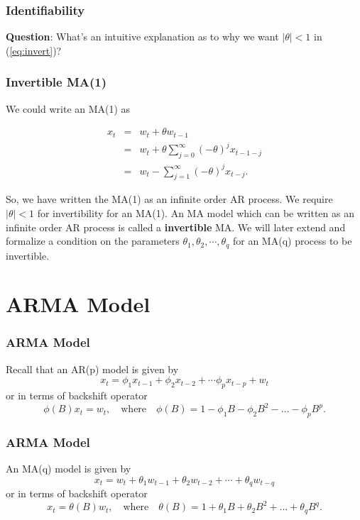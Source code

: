 \documentclass[%
xcolor=pdftex]{beamer}
\begin{document}
\begin{frame}
\frametitle{Identifiability}

\textbf{Question}: What's an intuitive explanation as to why we want $|\theta|<1$ in (\ref{eq:invert})?

\vspace{60mm}

\end{frame}


\begin{frame}
\frametitle{Invertible MA(1)}

We could write an MA(1) as

\begin{eqnarray*}
 x_t &=& w_t + \theta w_{t-1} \\
     &=& w_t +\theta \sum_{j=0}^\infty (-\theta)^j x_{t-1-j}\\
     &=&  w_t - \sum_{j=1}^\infty (-\theta)^j x_{t-j}.
\end{eqnarray*}

 So, we have written the MA(1) as an infinite order AR process. We require $|\theta|<1$ for invertibility for an MA(1). An MA model which can be written as an infinite order AR process is called a \textbf{invertible} MA.  We will later extend and formalize a condition on the parameters $\theta_1, \theta_2, \cdots, \theta_q$ for an MA(q) process to be invertible.


\end{frame}



\section{ARMA Model}
\frame{\tableofcontents[currentsection]}

\begin{frame}
\frametitle{ARMA Model}

Recall that an AR(p) model is given by
 $$
 x_t=\phi_1 x_{t-1} +\phi_2 x_{t-2} + \cdots \phi_p x_{t-p} + w_t
 $$
 or in terms of backshift operator
 $$
\phi(B) x_t =w_t, \quad \mbox{where} \quad \phi(B)=1-\phi_1 B-\phi_2 B^2-\ldots-\phi_p B^p.
$$

\end{frame}

\begin{frame}
\frametitle{ARMA Model}

An MA(q) model is given by
$$
x_t = w_t + \theta_1 w_{t-1} + \theta_2 w_{t-2} + \cdots + \theta_q w_{t-q}
$$
or in terms of backshift operator
$$
x_t =  \theta(B)w_t, \quad \mbox{where} \quad \theta(B)=1+\theta_1 B+\theta_2 B^2 +\ldots + \theta_q B^q.
$$

\end{frame}
\end{document}

